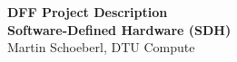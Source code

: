 \documentclass[fleqn,12pt]{article}
\begin{document}
\setlength{\baselineskip}{1.44\baselineskip}


\begin{center}
  {\LARGE\bf DFF Project Description }\\[1ex]
  {\LARGE\bf Software-Defined Hardware (SDH)}\\[1ex]
  {\large Martin Schoeberl, DTU Compute}\\[1ex]
 \end{center}


%

\end{document}
